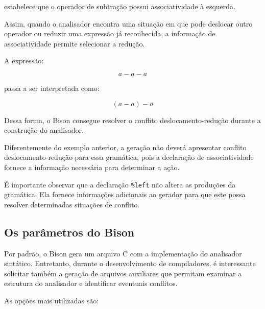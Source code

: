 \documentclass[
  brazilian,
  letterpaper,
]{book}
\theoremstyle{plain}
\theoremstyle{definition}
\theoremstyle{remark}
\begin{document}
estabelece que o operador de subtração possui associatividade à
esquerda.

Assim, quando o analisador encontra uma situação em que pode deslocar
outro operador ou reduzir uma expressão já reconhecida, a informação de
associatividade permite selecionar a redução.

A expressão:

\[
a-a-a
\]

passa a ser interpretada como:

\[
(a-a)-a
\]

Dessa forma, o Bison consegue resolver o conflito deslocamento-redução
durante a construção do analisador.

Diferentemente do exemplo anterior, a geração não deverá apresentar
conflito deslocamento-redução para essa gramática, pois a declaração de
associatividade fornece a informação necessária para determinar a ação.

É importante observar que a declaração \texttt{\%left} não altera as
produções da gramática. Ela fornece informações adicionais ao gerador
para que este possa resolver determinadas situações de conflito.

\subsection{Os parâmetros do Bison}\label{os-paruxe2metros-do-bison}

Por padrão, o Bison gera um arquivo C com a implementação do analisador
sintático. Entretanto, durante o desenvolvimento de compiladores, é
interessante solicitar também a geração de arquivos auxiliares que
permitam examinar a estrutura do analisador e identificar eventuais
conflitos.

As opções mais utilizadas são:
\end{document}
